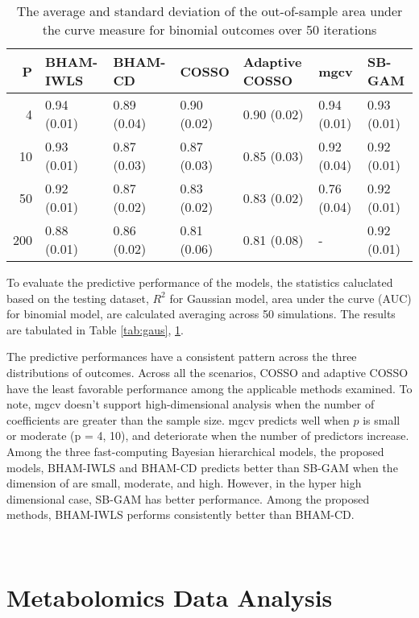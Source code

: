 \documentclass[AMA,STIX1COL,]{WileyNJD-v2}
\begin{document}
\begin{table}[ht]
\centering
\begin{tabular}{rllllll}
  \hline
P & BHAM-IWLS & BHAM-CD & COSSO & Adaptive COSSO & mgcv & SB-GAM \\ 
  \hline
  4 & 0.94 (0.01) & 0.89 (0.04) & 0.90 (0.02) & 0.90 (0.02) & 0.94 (0.01) & 0.93 (0.01) \\ 
   10 & 0.93 (0.01) & 0.87 (0.03) & 0.87 (0.03) & 0.85 (0.03) & 0.92 (0.04) & 0.92 (0.01) \\ 
   50 & 0.92 (0.01) & 0.87 (0.02) & 0.83 (0.02) & 0.83 (0.02) & 0.76 (0.04) & 0.92 (0.01) \\ 
  200 & 0.88 (0.01) & 0.86 (0.02) & 0.81 (0.06) & 0.81 (0.08) & - & 0.92 (0.01) \\ 
   \hline
\end{tabular}
\caption{The average and standard deviation of the out-of-sample area under the curve measure for binomial outcomes over 50 iterations} 
\label{tab:bin_auc}
\end{table}

To evaluate the predictive performance of the models, the statistics
caluclated based on the testing dataset, \(R^2\) for Gaussian model,
area under the curve (AUC) for binomial model, are calculated averaging
across 50 simulations. The results are tabulated in Table
\ref{tab:gaus}, \ref{tab:bin_auc}.

The predictive performances have a consistent pattern across the three
distributions of outcomes. Across all the scenarios, COSSO and adaptive
COSSO have the least favorable performance among the applicable methods
examined. To note, mgcv doesn't support high-dimensional analysis when
the number of coefficients are greater than the sample size. mgcv
predicts well when \(p\) is small or moderate (p = 4, 10), and
deteriorate when the number of predictors increase. Among the three
fast-computing Bayesian hierarchical models, the proposed models,
BHAM-IWLS and BHAM-CD predicts better than SB-GAM when the dimension of
are small, moderate, and high. However, in the hyper high dimensional
case, SB-GAM has better performance. Among the proposed methods,
BHAM-IWLS performs consistently better than BHAM-CD.

~

\hypertarget{metabolomics-data-analysis}{%
\section{Metabolomics Data Analysis}\label{metabolomics-data-analysis}}
\end{document}
